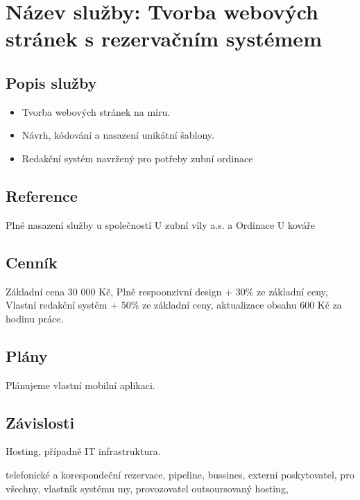 \documentclass[12pt, a4paper, titlepage]{article}
\begin{document}
	\newpage
	\noindent\makebox[\linewidth]{\rule{16cm}{0.4pt}}


	\section*{Název služby: Tvorba webových stránek s rezervačním systémem}

	\vspace{1em}

	\subsection*{Popis služby}
	\begin{itemize}
		\item Tvorba webových stránek na míru.
		\item Návrh, kódování a nasazení unikátní šablony.
		\item Redakční systém navržený pro potřeby zubní ordinace
	\end{itemize}

	\subsection*{Reference}
	Plné nasazení služby u společností U zubní víly a.s. a Ordinace U kováře

	\subsection*{Cenník}
	Základní cena 30 000 Kč, Plně respoonzivní design + 30\% ze základní ceny, Vlastní redakční systém + 50\% ze základní ceny, aktualizace obsahu 600 Kč za hodinu práce.

	\subsection*{Plány}
	Plánujeme vlastní mobilní aplikaci.

	\subsection*{Závislosti}
	Hosting, případně IT infrastruktura.

	telefonické a korespondeční rezervace, pipeline, bussines, externí poskytovatel, pro všechny,
	vlastník systému my, provozovatel outsoursovaný hosting, 

	\newpage

	\noindent\makebox[\linewidth]{\rule{16cm}{0.4pt}}
\end{document}
